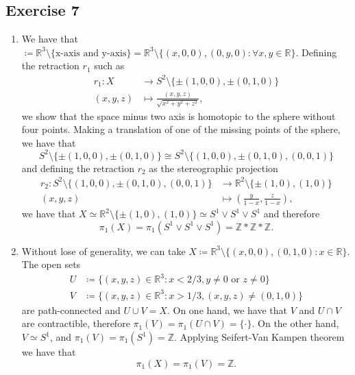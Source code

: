 \documentclass[11pt,a4paper]{article}
\newcommand{\R}{\mathbb R}
\newcommand{\Z}{\mathbb Z}
\begin{document}
\subsection*{Exercise 7}
\renewcommand{\theenumi}{\alph{enumi}} 
\begin{enumerate}
  \item We have that $  \coloneq \mathbb R^3 \setminus \{\text{x-axis and y-axis}\} = \mathbb R^3 \setminus \{(x, 0, 0), (0, y, 0) : \forall x, y \in \mathbb R\} $. Defining the retraction $ r_1 $ such as 
  \begin{align*}
    r_1 \colon X &\to S^2 \setminus \{\pm (1, 0, 0), \pm (0, 1, 0) \} \\
    (x, y, z) &\mapsto \frac{(x, y, z)}{\sqrt{x^2 + y^2 + z^2}},
  \end{align*}
  we show that the space minus two axis is homotopic to the sphere without four points. Making a translation of one of the missing points of the sphere, we have that
  $$
    S^2 \setminus \{\pm (1, 0, 0), \pm (0, 1, 0) \} \cong S^2 \setminus \{(1, 0, 0), \pm (0, 1, 0), (0, 0, 1) \}
  $$
  and defining the retraction $r_2$ as the stereographic projection
  \begin{align*}
    r_2 \colon S^2 \setminus \{(1, 0, 0), \pm (0, 1, 0), (0, 0, 1) \} &\to \mathbb R^2 \setminus \{\pm (1, 0), (1, 0) \} \\
    (x, y, z) &\mapsto \left(\frac{y}{1-x}, \frac{z}{1-x}\right),
  \end{align*}
  we have that
  $
    X \simeq \mathbb R^2 \setminus \{\pm (1, 0), (1, 0) \} \simeq S^1 \vee S^1 \vee S^1 
  $
  and therefore
  $$
    \pi_1 (X) = \pi_1(S^1 \vee S^1 \vee S^1) = \mathbb Z * \mathbb Z * \mathbb Z.
  $$
  
  \item Without lose of generality, we can take $ X \coloneq \R^3 \setminus \{(x, 0, 0), (0, 1, 0) : x \in \R \} $. The open sets 
  \begin{align*}
    U &\coloneq \{(x, y, z) \in \R^3 : x < 2/3, y \neq 0 \text{ or } z \neq 0\} \\
    V &\coloneq \{(x, y, z) \in \R^3 : x > 1/3, (x, y, z) \neq (0, 1, 0) \}
  \end{align*} 
  are path-connected and $ U \cup V = X $. On one hand, we have that $ V $ and $ U \cap V $ are contractible, therefore $ \pi_1(V) = \pi_1(U \cap V) = \{ \cdot \} $. On the other hand, $ V \simeq S^1 $, and $ \pi_1(V) = \pi_1(S^1) = \Z$. Applying Seifert-Van Kampen theorem we have that
  $$
    \pi_1(X) = \pi_1(V) = \Z.
  $$


\end{enumerate}
\end{document}
